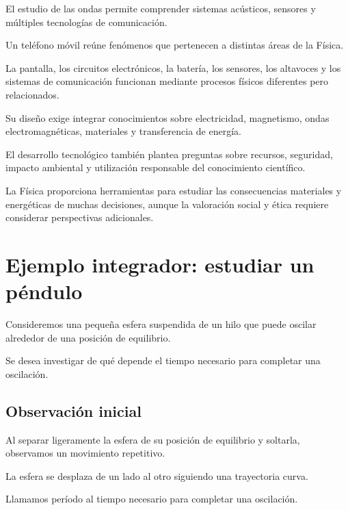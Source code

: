El estudio de las ondas permite
comprender sistemas acústicos,
sensores y múltiples tecnologías
de comunicación.

\begin{aplicacion}

Un teléfono móvil reúne fenómenos
que pertenecen a distintas áreas
de la Física.

La pantalla, los circuitos electrónicos,
la batería, los sensores, los altavoces
y los sistemas de comunicación
funcionan mediante procesos físicos
diferentes pero relacionados.

Su diseño exige integrar conocimientos
sobre electricidad, magnetismo,
ondas electromagnéticas, materiales
y transferencia de energía.

\end{aplicacion}

El desarrollo tecnológico también plantea
preguntas sobre recursos, seguridad,
impacto ambiental y utilización
responsable del conocimiento científico.

La Física proporciona herramientas
para estudiar las consecuencias materiales
y energéticas de muchas decisiones,
aunque la valoración social y ética
requiere considerar perspectivas adicionales.


\section{Ejemplo integrador: estudiar un péndulo}

\begin{ejemplo}

Consideremos una pequeña esfera suspendida
de un hilo que puede oscilar alrededor
de una posición de equilibrio.

Se desea investigar de qué depende
el tiempo necesario para completar
una oscilación.

\end{ejemplo}

\subsection{Observación inicial}

Al separar ligeramente la esfera
de su posición de equilibrio y soltarla,
observamos un movimiento repetitivo.

La esfera se desplaza de un lado
al otro siguiendo una trayectoria curva.

Llamamos período al tiempo necesario
para completar una oscilación.

